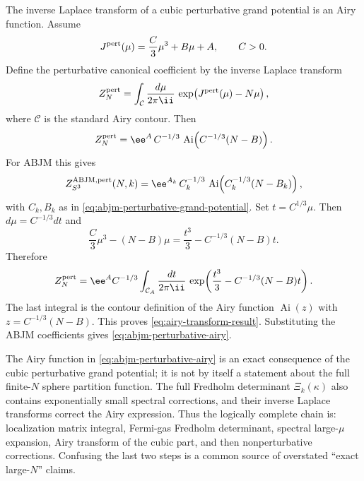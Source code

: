 The inverse Laplace transform of a cubic perturbative grand potential is an
Airy function.  Assume
\begin{equation}
  J^{\rm pert}(\mu)=\frac C3\mu^3+B\mu+A,
  \qquad C>0.
  \label{eq:cubic-grand-potential-general}
\end{equation}
Define the perturbative canonical coefficient by the inverse Laplace
transform
\begin{equation}
  Z_N^{\rm pert}
  =
  \int_{\mathcal C}\frac{d\mu}{2\pi\ii}\,
  \exp\!\left(J^{\rm pert}(\mu)-N\mu\right),
  \label{eq:perturbative-canonical-inverse-laplace}
\end{equation}
where \(\mathcal C\) is the standard Airy contour.  Then
\begin{equation}
  Z_N^{\rm pert}
  =
  \ee^A\,C^{-1/3}\,
  \operatorname{Ai}\!\left(C^{-1/3}(N-B)\right).
  \label{eq:airy-transform-result}
\end{equation}
For ABJM this gives
\begin{equation}
  Z_{S^3}^{\rm ABJM,pert}(N,k)
  =
  \ee^{A_k}\,
  C_k^{-1/3}\,
  \operatorname{Ai}\!\left(C_k^{-1/3}(N-B_k)\right),
  \label{eq:abjm-perturbative-airy}
\end{equation}
with \(C_k,B_k\) as in
\eqref{eq:abjm-perturbative-grand-potential}.
Set \(t=C^{1/3}\mu\).  Then \(d\mu=C^{-1/3}dt\) and
\[
  \frac C3\mu^3-(N-B)\mu
  =
  \frac{t^3}{3}
  -
  C^{-1/3}(N-B)t .
\]
Therefore
\[
  Z_N^{\rm pert}
  =
  \ee^A C^{-1/3}
  \int_{\mathcal C_A}\frac{dt}{2\pi\ii}\,
  \exp\!\left(\frac{t^3}{3}
  -
  C^{-1/3}(N-B)t\right).
\]
The last integral is the contour definition of the Airy function
\(\operatorname{Ai}(z)\) with \(z=C^{-1/3}(N-B)\).  This proves
\eqref{eq:airy-transform-result}.  Substituting the ABJM coefficients gives
\eqref{eq:abjm-perturbative-airy}.

\begin{remark}
\label{rem:abjm-airy-status}
The Airy function in \eqref{eq:abjm-perturbative-airy} is an exact
consequence of the cubic perturbative grand potential; it is not by itself a
statement about the full finite-\(N\) sphere partition function.  The full
Fredholm determinant \(\Xi_k(\kappa)\) also contains exponentially small
spectral corrections, and their inverse Laplace transforms correct the
Airy expression.  Thus the logically complete chain is:
localization matrix integral, Fermi-gas Fredholm determinant, spectral
large-\(\mu\) expansion, Airy transform of the cubic part, and then
nonperturbative corrections.  Confusing the last two steps is a common
source of overstated ``exact large-\(N\)'' claims.
\end{remark}

